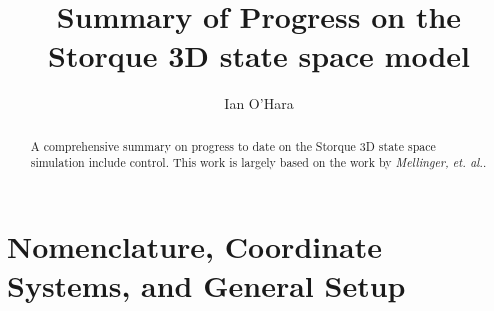 \documentclass{article}
\numberwithin{equation}{section}
\begin{document}
\title{Summary of Progress on the Storque 3D state space model}
\author{Ian O'Hara}

\maketitle

\begin{abstract}
A comprehensive summary on progress to date on the Storque 3D state space simulation include control.  This work is largely based on the work by \emph{Mellinger, et. al.}.
\end{abstract}

\section{Nomenclature, Coordinate Systems, and General Setup}
\end{document}
